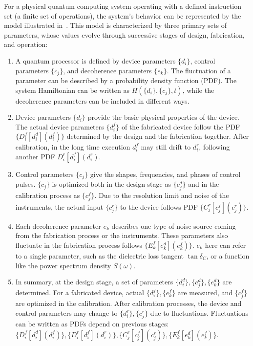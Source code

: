 \documentclass[a4paper,onecolumn,11pt,unpublished]{quantumarticle}
\newcommand{\setelem}[1]{\ensuremath{\{#1\}}}
\newcommand{\setelemtwo}[2]{\setelem{#1},\setelem{#2}}
\begin{document}
For a physical quantum computing system operating with a defined instruction set (a finite set of operations), the system's behavior can be represented by the model illustrated in~. This model is characterized by three primary sets of parameters, whose values evolve through successive stages of design, fabrication, and operation:
\begin{enumerate}
  \item A quantum processor is defined by device parameters $\setelem{d_i}$, control parameters $\setelem{c_j}$, and decoherence parameters $\setelem{e_k}$. The fluctuation of a parameter can be described by a probability density function (PDF). The system Hamiltonian can be written as $H(\setelemtwo{d_i}{c_j},t)$, while the decoherence parameters can be included in different ways.
  \item Device parameters $\setelem{d_i}$ provide the basic physical properties of the device. The actual device parameters $\setelem{d^f_i}$ of the fabricated device follow the PDF $\setelem{D^f_i[d^d_i](d^f_i)}$ determined by the design and the fabrication together. After calibration, in the long time execution $d^f_i$ may still drift to $d^r_i$, following another PDF $D^r_i[d_i^f](d_i^r)$.
  \item Control parameters $\setelem{c_j}$ give the shapes, frequencies, and phases of control pulses. $\setelem{c_j}$ is optimized both in the design stage as $\setelem{c^d_j}$ and in the calibration process as $\setelem{c^f_j}$. Due to the resolution limit and noise of the instruments, the actual input $\setelem{c_j^r}$ to the device follows PDF $\setelem{C^r_j[c_j^f](c^r_j)}$.
  \item Each decoherence parameter $e_k$ describes one type of noise source coming from the fabrication process or the instruments. These parameters also fluctuate in the fabrication process follows $\setelem{E_k^f[e_k^d](e_k^f)}$. $e_k$ here can refer to a single parameter, such as the dielectric loss tangent $\tan\delta_C$, or a function like the power spectrum density $S(\omega)$.
  \item In summary, at the design stage, a set of parameters $\setelem{d_i^d},\setelem{c_j^d},\setelem{e_k^d}$ are determined. For a fabricated device, actual $\setelem{d_i^f},\setelem{e_k^f}$ are measured, and $\setelem{c_j^f}$ are optimized in the calibration. After calibration processes, the device and control parameters may change to $\setelem{d_i^r},\setelem{c_j^r}$ due to fluctuations. Fluctuations can be written as PDFs depend on previous stages: $\setelem{D^f_i[d_i^d](d_i^f)},\setelem{D^r_i[d_i^f](d_i^r)},\setelem{C_j^r[c_j^f](c_j^r)},\setelem{E_k^f[e_k^d](e_k^f)}$.
\end{enumerate}
\end{document}

